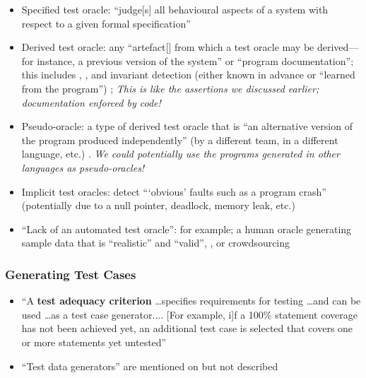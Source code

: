\begin{itemize}
      \item Specified test oracle: ``judge[s] all behavioural aspects of a
            system with respect to a given formal specification''
            \citep[p.~510]{BarrEtAl2015}
      \item Derived test oracle: any ``artefact[] from which a
            test oracle may be derived---for instance, a previous version of
            the system'' or ``program documentation''; this includes
            ,
            \citep[p.~510]{BarrEtAl2015}, and invariant detection (either
            known in advance or ``learned from the program'')
            \citep[p.~516]{BarrEtAl2015}; \emph{This is like the assertions
                  we discussed earlier; documentation enforced by code!}
      \item Pseudo-oracle: a type of derived test oracle that is ``an
            alternative version of the program produced independently'' (by a
            different team, in a different language, etc.)
            \citep[p.~515]{BarrEtAl2015}. \emph{We could potentially use the
                  programs generated in other languages as pseudo-oracles!}
      \item Implicit test oracles: detect ```obvious' faults such as a program
            crash'' (potentially due to a null pointer, deadlock, memory leak,
            etc.) \citep[p.~510]{BarrEtAl2015}
      \item ``Lack of an automated test oracle'': for example; a human oracle
            generating sample data that is ``realistic'' and ``valid'',
            \citep[pp.~510-511]{BarrEtAl2015}, or crowdsourcing
            \citep[p.~520]{BarrEtAl2015}
\end{itemize}

\subsubsection{Generating Test Cases}

\begin{itemize}
      \item ``A \textbf{test adequacy criterion} \dots specifies requirements
            for testing \dots and can be used \dots as a test case generator....
                  [For example, i]f a 100\% statement coverage has not been achieved
            yet, an additional test case is selected that covers one or more
            statements yet untested'' \citep[p.~402]{vanVliet2000}
      \item ``Test data generators'' are mentioned on
            \citep[p.~410]{vanVliet2000} but not described
\end{itemize}

